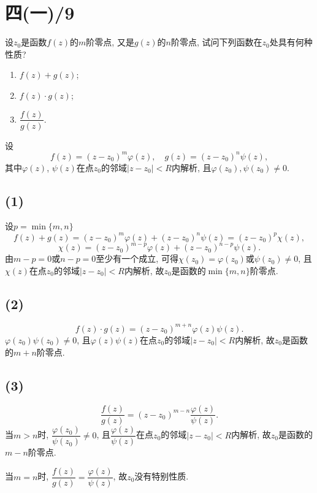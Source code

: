 \documentclass[11pt,a4paper]{article}
\author{刘逸灏 (515370910207)}
\begin{document}
\maketitle

\section{四(一)/9}
\begin{problem}
设$z_0$是函数$f(z)$的$m$阶零点, 又是$g(z)$的$n$阶零点, 试问下列函数在$z_0$处具有何种性质?
\begin{enumerate}
  \item $f(z)+g(z)$;
  \item $f(z)\cdot g(z)$;
  \item $\dfrac{f(z)}{g(z)}$.
\end{enumerate}
\end{problem}

设$$f(z)=(z-z_0)^m\varphi(z),\quad g(z)=(z-z_0)^n\psi(z),$$
其中$\varphi(z)$, $\psi(z)$在点$z_0$的邻域$|z-z_0|<R$内解析, 且$\varphi(z_0),\psi(z_0)\neq0$.

\subsection*{(1)}
设$p=\min\{m,n\}$
$$f(z)+g(z)=(z-z_0)^m\varphi(z)+(z-z_0)^n\psi(z)=(z-z_0)^p \chi(z),$$
$$\chi(z)=(z-z_0)^{m-p}\varphi(z)+(z-z_0)^{n-p}\psi(z).$$
由$m-p=0$或$n-p=0$至少有一个成立, 可得$\chi(z_0)=\varphi(z_0)$或$\psi(z_0)\neq 0$, 且$\chi(z)$在点$z_0$的邻域$|z-z_0|<R$内解析, 故$z_0$是函数的$\min\{m,n\}$阶零点.

\subsection*{(2)}
$$f(z)\cdot g(z)=(z-z_0)^{m+n}\varphi(z)\psi(z).$$
$\varphi(z_0)\psi(z_0)\neq0$, 且$\varphi(z)\psi(z)$在点$z_0$的邻域$|z-z_0|<R$内解析, 故$z_0$是函数的$m+n$阶零点.

\subsection*{(3)}
$$\frac{f(z)}{g(z)}=(z-z_0)^{m-n}\frac{\varphi(z)}{\psi(z)}.$$
当$m>n$时, $\dfrac{\varphi(z_0)}{\psi(z_0)}\neq0$, 且$\dfrac{\varphi(z)}{\psi(z)}$在点$z_0$的邻域$|z-z_0|<R$内解析, 故$z_0$是函数的$m-n$阶零点.

当$m=n$时, $\dfrac{f(z)}{g(z)}=\dfrac{\varphi(z)}{\psi(z)}$, 故$z_0$没有特别性质. \medskip
\end{document}
